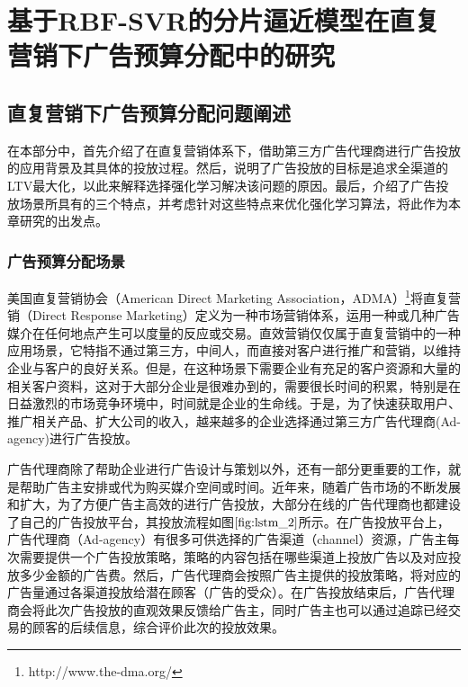 \chapter{基于RBF-SVR的分片逼近模型在直复营销下广告预算分配中的研究}


\section{直复营销下广告预算分配问题阐述}
在本部分中，首先介绍了在直复营销体系下，借助第三方广告代理商进行广告投放的应用背景及其具体的投放过程。然后，说明了广告投放的目标是追求全渠道的LTV最大化，以此来解释选择强化学习解决该问题的原因。最后，介绍了广告投放场景所具有的三个特点，并考虑针对这些特点来优化强化学习算法，将此作为本章研究的出发点。

\subsection{广告预算分配场景}
美国直复营销协会（American Direct Marketing Association，ADMA）\footnote{http://www.the-dma.org/}将直复营销（Direct Response Marketing）定义为一种市场营销体系，运用一种或几种广告媒介在任何地点产生可以度量的反应或交易。直效营销仅仅属于直复营销中的一种应用场景，它特指不通过第三方，中间人，而直接对客户进行推广和营销，以维持企业与客户的良好关系。但是，在这种场景下需要企业有充足的客户资源和大量的相关客户资料，这对于大部分企业是很难办到的，需要很长时间的积累，特别是在日益激烈的市场竞争环境中，时间就是企业的生命线。于是，为了快速获取用户、推广相关产品、扩大公司的收入，越来越多的企业选择通过第三方广告代理商(Ad-agency)进行广告投放。

广告代理商除了帮助企业进行广告设计与策划以外，还有一部分更重要的工作，就是帮助广告主安排或代为购买媒介空间或时间。近年来，随着广告市场的不断发展和扩大，为了方便广告主高效的进行广告投放，大部分在线的广告代理商也都建设了自己的广告投放平台，其投放流程如图$\ref{fig:lstm_2}$所示。在广告投放平台上，广告代理商（Ad-agency）有很多可供选择的广告渠道（channel）资源，广告主每次需要提供一个广告投放策略，策略的内容包括在哪些渠道上投放广告以及对应投放多少金额的广告费。然后，广告代理商会按照广告主提供的投放策略，将对应的广告量通过各渠道投放给潜在顾客（广告的受众）。在广告投放结束后，广告代理商会将此次广告投放的直观效果反馈给广告主，同时广告主也可以通过追踪已经交易的顾客的后续信息，综合评价此次的投放效果。

